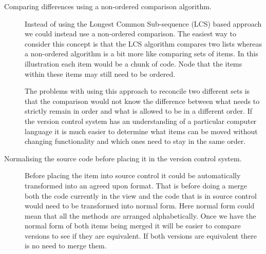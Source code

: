 \begin{description}
  \item [Comparing differences using a non-ordered comparison algorithm.]   
    Instead of using the Longest Common Sub-sequence (LCS) based approach we could instead use a non-ordered comparison.  The easiest way to consider this concept is that the LCS algorithm compares two lists whereas a non-ordered algorithm is a bit more like comparing sets of items. In this illustration each item would be a chunk of code. Node that the items within these items may still need to be ordered.

    The problems with using this approach to reconcile two different sets is that the comparison would not know the difference between what needs to strictly remain in order and what is allowed to be in a different order. If the version control system has an understanding of a particular computer language it is much easier to determine what items can be moved without changing functionality and which ones need to stay in the same order. 
  \item [Normalising the source code before placing it in the version control system.]
    Before placing the item into source control it could be automatically transformed into an agreed upon format. That is before doing a merge both the code currently in the view and the code that is in source control would need to be transformed into normal form.  Here normal form could mean that all the methods are arranged alphabetically.  Once we have the normal form of both items being merged it will be easier to compare versions to see if they are equivalent.  If both versions are equivalent there is no need to merge them. 


\end{description}

